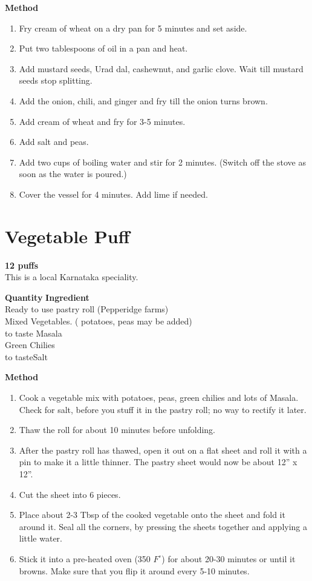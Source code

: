 {\bf Method}
\begin{enumerate}
   \item  Fry cream of wheat on a dry pan for 5 minutes and set aside.
   \item Put two tablespoons of oil in a pan and heat.
   \item Add mustard seeds, Urad dal, cashewnut, and garlic clove.  Wait  till
      mustard seeds stop splitting.
   \item Add  the  onion,  chili,  and  ginger  and fry till the onion turns
      brown.
   \item Add cream of wheat and fry for 3-5 minutes.
   \item Add salt and peas.
   \item Add two cups of boiling water and stir for 2 minutes.  (Switch  off  the
      stove as soon as the water is poured.)
   \item Cover the vessel for 4 minutes. Add lime if needed.
\end{enumerate}

\section{Vegetable Puff}
{\bf 12 puffs\\}
This is a local Karnataka speciality.
\begin{tabbing}
\hspace{1.0cm}  \={\bf Quantity}   \hspace{3.0cm} \={\bf Ingredient}\\
 \>Ready to use pastry roll (Pepperidge farms)\\
\>  \> Mixed Vegetables. ( potatoes, peas may be added)\\
\>to taste  \> Masala\\
\>\>Green Chilies\\
\>to taste\>Salt\\
\end{tabbing}

{\bf Method}
\begin{enumerate}
\item Cook a vegetable mix with potatoes, peas, green chilies and
lots of Masala. Check for salt, before you stuff it in the pastry roll; no way to rectify it later.
\item Thaw the roll for about 10 minutes before unfolding.
\item           After the pastry roll has thawed, open it out on a flat sheet and
roll it with a pin to make it a little thinner.
The pastry sheet would now be about 12'' x  12''. 
\item Cut the sheet into 6 pieces.
\item Place about 2-3 Tbsp of the cooked
vegetable onto the sheet and fold it around it. Seal all the corners, by
pressing the sheets together and applying a little water.
\item Stick it into a pre-heated oven (350 $F^\circ$) for about 20-30
minutes or until it browns. Make sure that you flip it around every
5-10 minutes.
\end{enumerate}
                

